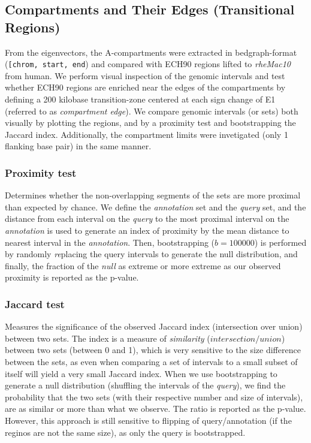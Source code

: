 \documentclass[
  11pt,
  a4paper,
]{scrbook}
\let\oldemph\emph
\renewcommand\emph[1]{\oldemph{\color{gray}#1}}
\begin{document}
\subsection{Compartments and Their Edges (Transitional
Regions)}\label{compartments-and-their-edges-transitional-regions}

From the eigenvectors, the A-compartments were extracted in
bedgraph-format
(\texttt{{[}\textquotesingle{}chrom\textquotesingle{},\ \textquotesingle{}start\textquotesingle{},\ \textquotesingle{}end\textquotesingle{}{]}})
and compared with ECH90 regions lifted to \emph{rheMac10} from human. We
perform visual inspection of the genomic intervals and test whether
ECH90 regions are enriched near the edges of the compartments by
defining a 200 kilobase transition-zone centered at each sign change of
E1 (referred to as \emph{compartment edge}). We compare genomic
intervals (or sets) both visually by plotting the regions, and by a
proximity test and bootstrapping the Jaccard index. Additionally, the
compartment limits were invetigated (only 1 flanking base pair) in the
same manner.

\subsubsection{Proximity test}\label{proximity-test}

Determines whether the non-overlapping segments of the sets are more
proximal than expected by chance. We define the \emph{annotation} set
and the \emph{query} set, and the distance from each interval on the
\emph{query} to the most proximal interval on the \emph{annotation} is
used to generate an index of proximity by the mean distance to nearest
interval in the \emph{annotation}. Then, bootstrapping (\(b = 100000\))
is performed by randomly \emph{re}placing the query intervals to
generate the null distribution, and finally, the fraction of the
\emph{null} as extreme or more extreme as our observed proximity is
reported as the p-value.

\subsubsection{Jaccard test}\label{jaccard-test}

Measures the significance of the observed Jaccard index (intersection
over union) between two sets. The index is a measure of
\emph{similarity} (\(intersection/union\)) between two sets (between 0
and 1), which is very sensitive to the size difference between the sets,
as even when comparing a set of intervals to a small subset of itself
will yield a very small Jaccard index. When we use bootstrapping to
generate a null distribution (shuffling the intervals of the
\emph{query}), we find the probability that the two sets (with their
respective number and size of intervals), are as similar or more than
what we observe. The ratio is reported as the p-value. However, this
approach is still sensitive to flipping of query/annotation (if the
reginos are not the same size), as only the query is bootstrapped.
\end{document}
